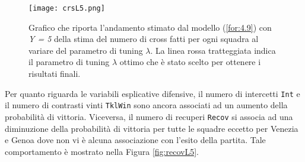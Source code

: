 \begin{figure}[htbp]
	\begin{center}
		\texttt{[image: crsL5.png]}
		\caption{Grafico che riporta l'andamento stimato dal modello (\ref{for:4.9}) con \emph{Y = 5} della stima del numero di cross fatti per ogni squadra al variare del parametro di tuning $\lambda$. La linea rossa tratteggiata indica il parametro di tuning $\lambda$ ottimo che è stato scelto per ottenere i risultati finali.} \label{fig:crsL5}
	\end{center}
\end{figure}
Per quanto riguarda le variabili esplicative difensive, il numero di intercetti \texttt{Int} e il numero di contrasti vinti \texttt{TklWin} sono ancora associati ad un aumento della probabilità di vittoria. Viceversa, il numero di recuperi \texttt{Recov} si associa ad una diminuzione della probabilità di vittoria per tutte le squadre eccetto per Venezia e Genoa dove non vi è alcuna associazione con l'esito della partita. Tale comportamento è mostrato nella Figura \ref{fig:recovL5}.

